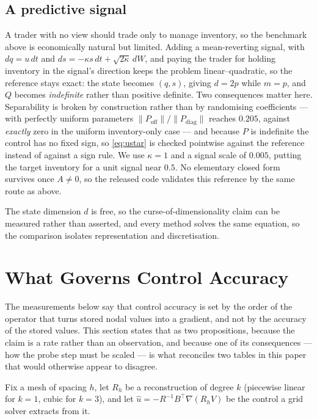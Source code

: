 \documentclass[conference]{IEEEtran}
\begin{document}
\subsection{A predictive signal}\label{sec:alpha}
A trader with no view should trade only to manage inventory, so the benchmark above is economically
natural but limited. Adding a mean-reverting signal, with $dq = u\,dt$ and
$ds = -\kappa s\,dt + \sqrt{2\kappa}\,dW$, and paying the trader for holding inventory in the
signal's direction keeps the problem linear--quadratic, so the reference stays exact: the state
becomes $(q,s)$, giving $d = 2p$ while $m = p$, and $Q$ becomes \emph{indefinite} rather than
positive definite. Two consequences matter here. Separability is broken by construction rather than
by randomising coefficients --- with perfectly uniform parameters
$\|P_{\text{off}}\|/\|P_{\text{diag}}\|$ reaches $0.205$, against \emph{exactly} zero in the uniform
inventory-only case --- and because $P$ is indefinite the control has no fixed sign, so
\eqref{eq:ustar} is checked pointwise against the reference instead of against a sign rule. We use
$\kappa = 1$ and a signal scale of $0.005$, putting the target inventory for a unit signal near
$0.5$. No elementary closed form survives once $A \neq 0$, so the released code validates this
reference by the same route as above.

The state dimension $d$ is free, so the curse-of-dimensionality claim can be measured rather than
asserted, and every method solves the same equation, so the comparison isolates representation and
discretisation.

\section{What Governs Control Accuracy}\label{sec:theory}

The measurements below say that control accuracy is set by the order of the operator that turns
stored nodal values into a gradient, and not by the accuracy of the stored values. This section
states that as two propositions, because the claim is a rate rather than an observation, and because
one of its consequences --- how the probe step must be scaled --- is what reconciles two tables in
this paper that would otherwise appear to disagree.

Fix a mesh of spacing $h$, let $R_h$ be a reconstruction of degree $k$ (piecewise linear for
$k=1$, cubic for $k=3$), and let $\widehat{u} = -R^{-1}B^\top \nabla (R_h V)$ be the control a grid
solver extracts from it.
\end{document}
